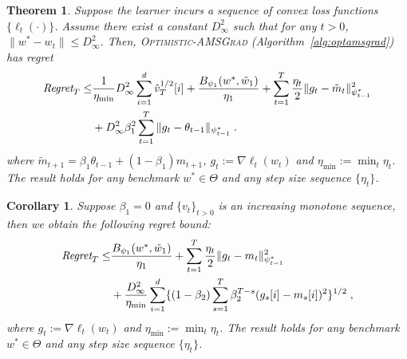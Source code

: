 \documentclass[11pt]{article}
\newtheorem{Theorem}{Theorem}
\newtheorem{Corollary}{Corollary}
\theoremstyle{k}
\begin{document}
\begin{Theorem} \label{thm:convexmain}
Suppose the learner incurs a sequence of convex loss functions $\{ \ell_{t}(\cdot) \}$.
Assume there exist a constant $D_{\infty}^2$ such that for any $t >0$, $\|w^* - w_t\| \leq D_{\infty}^2$.
Then,  \textsc{Optimistic-AMSGrad} (Algorithm~\ref{alg:optamsgrad}) has regret 
\begin{equation} \label{bound:optadabeta}
\begin{aligned}
 \text{\it Regret}_T \leq & \frac{1}{\eta_{\min}} D_{\infty}^2 \sum_{i=1}^d \hat{v}_{T}^{1/2}[i] + \frac{ B_{\psi_1}(w^*, \tilde{w}_{1})}{\eta_1}
+ \sum_{t=1}^T\frac{\eta_t}{2} \| g_t - \tilde{m}_t  \|_{\psi_{t-1}^*}^2  \\
& +D_{\infty}^2 \beta_1^2  \sum_{t=1}^T \| g_t - \theta_{t-1}  \|_{\psi_{t-1}^*}  \;.
\end{aligned}
\end{equation}
where $ \tilde{m}_{t+1}  = \beta_1 \theta_{t-1} +(1-\beta_1) m_{t+1}$, $g_{t}:= \nabla \ell_{t}(w_t)$ and $\eta_{{\min}} := \min_{{t}} \eta_{t}$.
The result holds for any benchmark $w^{*} \in \Theta$ and any step size sequence $\{ \eta_t \}$.
\end{Theorem}

\begin{Corollary}
Suppose $\beta_1=0$ and $\{v_t\}_{t>0}$ is an increasing monotone sequence, then we obtain the following regret bound: 
\begin{equation} 
\begin{aligned}
 \text{\it Regret}_T \leq & \frac{ B_{\psi_1}(w^*, \tilde{w}_{1})}{\eta_1}
+ \sum_{t=1}^T\frac{\eta_t}{2} \| g_t - m_t  \|_{\psi_{t-1}^*}^2 \\
& +\frac{D_{\infty}^2}{\eta_{\min}} \sum_{i=1}^d \{ (1-\beta_2) \sum_{s=1}^{T} \beta_2^{T-s} (g_s[i] - m_s[i])^2 \}^{1/2} \;,
\end{aligned}
\end{equation}
where $g_{t}:= \nabla \ell_{t}(w_t)$ and $\eta_{{\min}} := \min_{{t}} \eta_{t}$.
The result holds for any benchmark $w^{*} \in \Theta$ and any step size sequence $\{ \eta_t \}$.
\end{Corollary}
\end{document}
